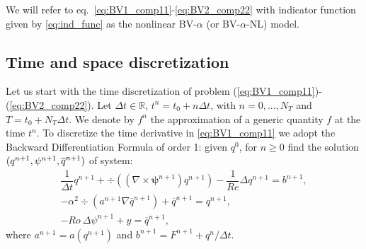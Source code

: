 \documentclass[11pt,a4paper]{article}
\begin{document}

We will refer to eq.~\eqref{eq:BV1_comp11}-\eqref{eq:BV2_comp22} with indicator function given by 
\eqref{eq:ind_func} as the nonlinear BV-$\alpha$ (or BV-$\alpha$-NL) model.

\subsection{Time and space discretization}
\label{subsec:time-discrete}

Let us start with the time discretization of problem (\ref{eq:BV1_comp11})-(\ref{eq:BV2_comp22}). 
Let $\Delta t \in \mathbb{R}$, $t^n = t_0 + n \Delta t$, with $n = 0, ..., N_T$ and $T = t_0 + N_T \Delta t$. We denote by $f^n$ the approximation of a generic quantity $f$ at the time $t^n$. %
To discretize the time derivative in \eqref{eq:BV1_comp11}
we adopt the Backward Differentiation Formula of order 1: given $q^0$, for $n \geq 0$ find the solution $(q^{n+1}, \psi^{n+1},\overline{q}^{n+1})$ of system: %
\begin{align}
\dfrac{1}{\Delta t} q^{n+1} + \div \left(\left(\nabla \times \bm{\psi}^{n+1}\right) q^{n+1} \right) - \dfrac{1}{Re} \Delta q^{n+1} = b^{n+1}, \label{eq:BV1_comp11_timedisc} \\ %
-\alpha^2\div \left(a^{n+1} \nabla\overline{q}^{n+1}\right) + \overline{q}^{n+1} = q^{n+1}, \label{eq:BV2_comp33_timedisc} \\
-Ro~\Delta \psi^{n+1} + y = \overline{q}^{n+1}, \label{eq:BV2_comp22_timedisc}
\end{align}
where $a^{n+1}  = a(q^{n+1} )$ and $b^{n+1} = F^{n+1} + q^n/\Delta t$. 
\end{document}
